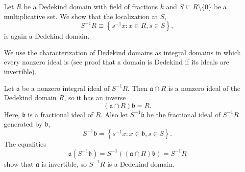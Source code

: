 \documentclass[12pt]{article}
\begin{document}

Let $R$ be a Dedekind domain with field of fractions $k$ and $S\subseteq R\setminus\{0\}$ be a multiplicative set. We show that the localization at $S$,
\begin{equation*}
S^{-1}R\equiv\left\{s^{-1}x:x\in R,s\in S\right\},
\end{equation*}
is again a Dedekind domain.

We use the characterization of Dedekind domains as integral domains in which every nonzero ideal is  (see proof that a domain is Dedekind if its ideals are invertible).


Let $\mathfrak{a}$ be a nonzero integral ideal of $S^{-1}R$. Then $\mathfrak{a}\cap R$ is a nonzero ideal of the Dedekind domain $R$, so it has an inverse
\begin{equation*}
\left(\mathfrak{a}\cap R\right)\mathfrak{b}=R.
\end{equation*}
Here, $\mathfrak{b}$ is a fractional ideal of $R$. Also let $S^{-1}\mathfrak{b}$ be the fractional ideal of $S^{-1}R$ generated by $\mathfrak{b}$,
\begin{equation*}
S^{-1}\mathfrak{b}=\left\{s^{-1}x:x\in\mathfrak{b}, s\in S\right\}.
\end{equation*} 
The equalities
\begin{equation*}
\mathfrak{a}(S^{-1}\mathfrak{b})=S^{-1}\left((\mathfrak{a}\cap R)\mathfrak{b}\right)=S^{-1}R
\end{equation*}
show that $\mathfrak{a}$ is invertible, so $S^{-1}R$ is a Dedekind domain.
\end{document}

